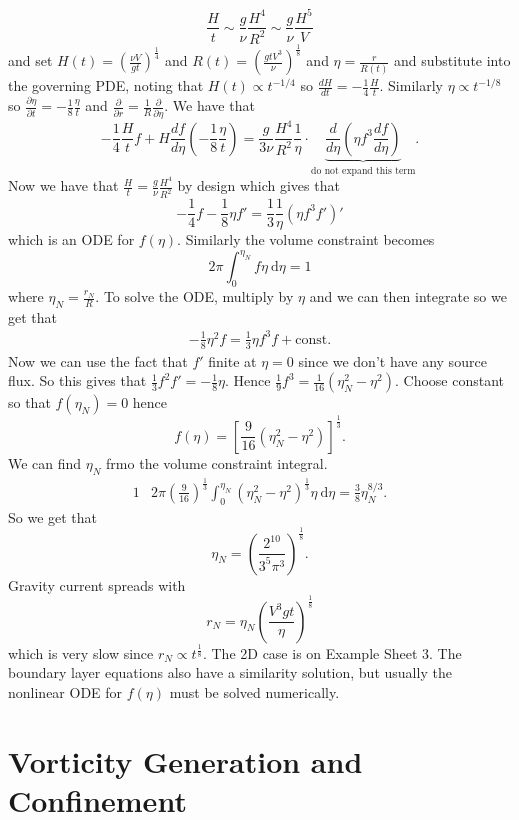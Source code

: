 \documentclass{article}
\begin{document}
\[
	\frac Ht \sim \frac g \nu \frac{H^4}{R^2} \sim \frac g\nu \frac{H^5} V
\]
and set $ H(t) = \left(\frac{\nu V}{gt}\right)^{\frac 14} $ and $ R(t) = \left(\frac{gt V^3}{\nu}\right)^{\frac 18} $ and $ \eta = \frac r{R(t)} $ and substitute into the governing PDE, noting that $ H(t) \propto t^{-1/4} $ so $ \frac{dH}{dt} = - \frac 14 \frac Ht $. Similarly $ \eta \propto t^{-1/8} $ so $ \frac{\partial \eta}{\partial t} = -\frac 18 \frac \eta t $ and $ \frac{\partial}{\partial r} = \frac 1R \frac{\partial}{\partial \eta} $. We have that
\[
	-\frac 14 \frac Ht f + H \frac{d f}{d\eta} \left(-\frac 18 \frac \eta t\right) = \frac g{3\nu}\frac{H^4}{R^2}\frac 1\eta \cdot \underbrace{\frac{d}{d\eta}\left( \eta f^3 \frac{df}{d\eta}\right)}_{\text{do not expand this term}}.
\]
Now we have that $ \frac Ht = \frac g\nu \frac{H^4}{R^2} $ by design which gives that
\[
  -\frac 14 f - \frac 1 8 \eta f' = \frac 13 \frac 1\eta(\eta f^3f')'
\]
which is an ODE for $ f(\eta) $. Similarly the volume constraint becomes
\[
	2\pi \int_0^{\eta_N} f \eta \ \mathrm d\eta = 1
\]
where $ \eta_N = \frac{r_N}R $. To solve the ODE, multiply by $ \eta $ and we can then integrate so we get that
\begin{align*}
	- \frac 18 \eta^2 f = \frac13 \eta f^3 f + \text{const.}
\end{align*}
Now we can use the fact that $ f' $ finite at $ \eta =0 $ since we don't have any source flux. So this gives that $ \frac 13 f^2f' = - \frac 18 \eta $. Hence $ \frac 19 f^3 = \frac 1{16} (\eta_N^2 - \eta^2) $. Choose constant so that $ f(\eta_N) = 0 $ hence
\[
	f(\eta) = \left[ \frac 9{16}(\eta_N^2 - \eta^2)\right]^{\frac 13}.
\]
We can find $ \eta_N $ frmo the volume constraint integral. 
\begin{align*}
	1 & 2\pi \left(\frac 9{16}\right)^{\frac 13} \int_0^{\eta_N} (\eta_N^2 - \eta^2)^{\frac 13} \eta \ \mathrm d\eta = \frac 38 \eta_N^{8/3}.
\end{align*}
So we get that
\[
	\eta_N = \left(\frac{2^{10}}{3^5 \pi^3}\right)^{\frac 18}.
\]
Gravity current spreads with 
\[
	r_N  =\eta_N \left(\frac{V^3 gt}\eta\right)^{\frac 18}
\]
which is very slow since $ r_N\propto t^{\frac 18} $. The 2D case is on Example Sheet 3. The boundary layer equations also have a similarity solution, but usually the nonlinear ODE for $ f(\eta) $ must be solved numerically.
\section{Vorticity Generation and Confinement}
\end{document}

